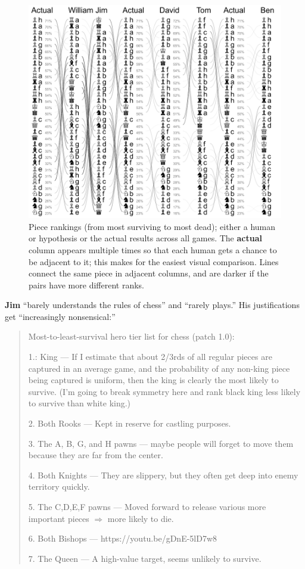 \documentclass[twocolumn]{article}
\begin{document}
\begin{figure}[t]
  \includegraphics[width=\linewidth]{hypotheses}
  \caption{
    Piece rankings (from most surviving to most dead); either a
    human or hypothesis or the actual results across all games. 
    The {\bf actual} column appears multiple times so that each human
    gets a chance to be adjacent to it; this makes for the easiest
    visual comparison. Lines connect the same piece in adjacent columns,
    and are darker if the pairs have more different ranks.
  } \label{fig:buddies}
\end{figure}

{\bf Jim} ``barely understands the rules of chess'' and ``rarely plays.'' His justifications get ``increasingly nonsensical:''

\begin{quote}
Most-to-least-survival hero tier list for chess (patch 1.0):

1.: King --- If I estimate that about 2/3rds of all regular pieces are
captured in an average game, and the probability of any non-king piece
being captured is uniform, then the king is clearly the most likely to
survive. (I'm going to break symmetry here and rank black king less
likely to survive than white king.)

2. Both Rooks --- Kept in reserve for castling purposes.

3. The A, B, G, and H pawns --- maybe people will forget to move them because they are far from the center.

4. Both Knights --- They are slippery, but they often get deep into enemy territory quickly.

5. The C,D,E,F pawns --- Moved forward to release various more important pieces $\Rightarrow$ more likely to die.

6. Both Bishops --- https://youtu.be/gDnE-5lD7w8

7. The Queen --- A high-value target, seems unlikely to survive.
\end{quote}
\end{document}
